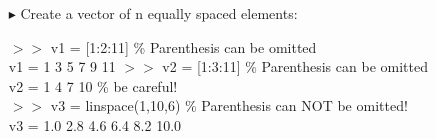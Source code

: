 \documentclass[xcolor={dvipsnames,rgb}, aspectratio=169]{beamer}
\begin{document}
\begin{frame}{}
\begin{itemize}
   \item[$\blacktriangleright$] Create a vector of n equally spaced elements:
      \begin{tcolorbox}[colback=white,colframe=bluepoli]
         $>>$ v1 = [1:2:11] \color{codegreen}\% Parenthesis can be omitted\\
         \color{black}
         v1 = \hspace{3em} 1 \hspace{3em} 3 \hspace{3em} 5 \hspace{3em} 7 \hspace{3em} 9 \hspace{3em} 11
         \tcblower
         $>>$ v2 = [1:3:11] \color{codegreen}\% Parenthesis can be omitted\\
         \color{black}
         v2 = \hspace{3em} 1 \hspace{3em} 4 \hspace{3em} 7 \hspace{3em} 10
         \color{codegreen} \% be careful! \DrawLine \\
         \color{black}
         $>>$ v3 = linspace(1,10,6) \color{codegreen} \% Parenthesis can NOT be omitted!\\
         \color{black}
         v3 = \hspace{3em} 1.0 \hspace{3em} 2.8 \hspace{3em} 4.6 \hspace{3em} 6.4 \hspace{3em} 8.2 \hspace{3em} 10.0
      \end{tcolorbox}
\end{itemize}
\end{frame}
\end{document}
